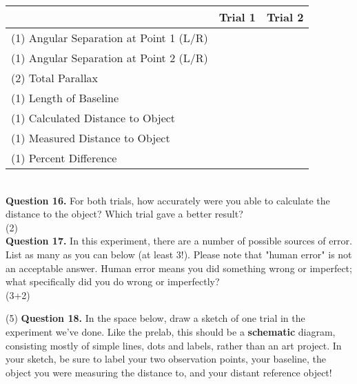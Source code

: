 \documentclass[11pt]{article}
\begin{document}
\begin{tabular}{| l | c | c |}
	\hline
	                               & Trial 1\hspace{4cm} & Trial 2\hspace{4cm}  \\ \hline
	(1) Angular Separation at Point 1 (L/R)  &                     &                      \\ \hline
	(1) Angular Separation at Point 2  (L/R) &                     &                      \\ \hline
	(2) Total Parallax                       &                     &                      \\ \hline
	(1) Length of Baseline                   &                     &                      \\ \hline
	(1) Calculated Distance to Object        &                     &                      \\ \hline
	(1) Measured Distance to Object          &                     &                      \\ \hline
	(1) Percent Difference                   &                     &                      \\
	\hline
\end{tabular}\\

\textbf{Question 16.} For both trials, how accurately were you able to calculate the distance to the object? Which trial gave a better result?\\

\vspace{1.5cm}
(2) \hrulefill\\

\textbf{Question 17.} In this experiment, there are a number of possible sources of error. List as many as you can below (at least 3!). Please note that "human error" is not an acceptable answer. Human error means you did something wrong or imperfect; what specifically did you do wrong or imperfectly?\\

\vspace{4.5cm}
(3+2)\hrulefill

\newpage

(5) \textbf{Question 18.} In the space below, draw a sketch of one trial in the experiment we've done. Like the prelab, this should be a \textbf{schematic} diagram, consisting mostly of simple lines, dots and labels, rather than an art project. In your sketch, be sure to label your two observation points, your baseline, the object you were measuring the distance to, and your distant reference object!
\end{document}

